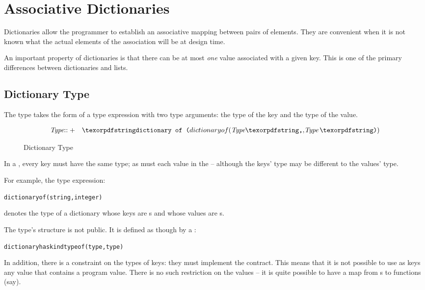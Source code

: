 \chapter{Associative Dictionaries}
\label{associativeMap}

Dictionaries allow the programmer to establish an associative mapping between pairs of elements. They are convenient when it is not known what the actual elements of the association will be at design time.

\begin{aside}
An important property of dictionaries is that there can be at most \emph{one} value associated with a given key. This is one of the primary differences between dictionaries and lists.
\end{aside}

\section{Dictionary Type}
\label{mapTypes}

The  type takes the form of a type expression with two type arguments: the type of the key and the type of the value.
\begin{figure}[htbp]
\begin{eqnarray*}
\emph{Type}&\arrowplus&\q{dictionary of (}\emph{Type}\q{,}\emph{Type}\,\q{)}
\end{eqnarray*}
\caption{Dictionary Type}
\label{mapTypeFig}
\end{figure}
In a , every key must have the same type; as must each value in the  -- although the keys' type may be different to the values' type.

For example, the type expression:
\begin{alltt}
dictionary of (string,integer)
\end{alltt}
denotes the type of a dictionary whose keys are s and whose values are s.

The  type's structure is not public. It is defined as though by a :
\begin{alltt}
dictionary has kind type of (type,type)
\end{alltt}
\begin{aside}
In addition, there is a constraint on the types of keys: they must implement the  contract. This means that it is not possible to use as keys any value that contains a program value. There is no such restriction on the values -- it is quite possible to have a map from s to functions (say).
\end{aside}


